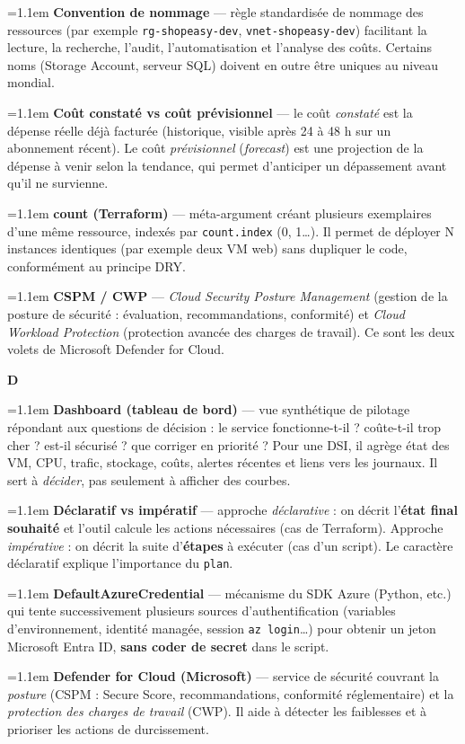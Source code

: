 \documentclass[11pt,a4paper]{article}
\newcommand{\co}[1]{\texttt{\small #1}}
\newcommand{\lettre}[1]{%
  \par\addvspace{9pt}\needspace{4.5\baselineskip}%
  \markright{#1}%
  {\noindent\sffamily\bfseries\Large\color{azure}#1}%
  \nobreak\vspace{0.4mm}{\color{azure!45}\hrule height 1pt}\nobreak\vspace{3mm}\par}
\newcommand{\df}[2]{%
  \par\addvspace{4pt}\needspace{2\baselineskip}%
  \hangindent=1.1em\hangafter=1
  {\sffamily\bfseries\color{azuredark}#1} — #2\par}
\begin{document}
\df{Convention de nommage}{règle standardisée de nommage des ressources (par exemple \co{rg-shopeasy-dev}, \co{vnet-shopeasy-dev}) facilitant la lecture, la recherche, l'audit, l'automatisation et l'analyse des coûts. Certains noms (Storage Account, serveur SQL) doivent en outre être uniques au niveau mondial.}

\df{Coût constaté vs coût prévisionnel}{le coût \emph{constaté} est la dépense réelle déjà facturée (historique, visible après 24 à 48 h sur un abonnement récent). Le coût \emph{prévisionnel} (\emph{forecast}) est une projection de la dépense à venir selon la tendance, qui permet d'anticiper un dépassement avant qu'il ne survienne.}

\df{count (Terraform)}{méta-argument créant plusieurs exemplaires d'une même ressource, indexés par \co{count.index} (0, 1\dots). Il permet de déployer N instances identiques (par exemple deux VM web) sans dupliquer le code, conformément au principe DRY.}

\df{CSPM / CWP}{\emph{Cloud Security Posture Management} (gestion de la posture de sécurité : évaluation, recommandations, conformité) et \emph{Cloud Workload Protection} (protection avancée des charges de travail). Ce sont les deux volets de Microsoft Defender for Cloud.}

\lettre{D}

\df{Dashboard (tableau de bord)}{vue synthétique de pilotage répondant aux questions de décision : le service fonctionne-t-il ? coûte-t-il trop cher ? est-il sécurisé ? que corriger en priorité ? Pour une DSI, il agrège état des VM, CPU, trafic, stockage, coûts, alertes récentes et liens vers les journaux. Il sert à \emph{décider}, pas seulement à afficher des courbes.}

\df{Déclaratif vs impératif}{approche \emph{déclarative} : on décrit l'\textbf{état final souhaité} et l'outil calcule les actions nécessaires (cas de Terraform). Approche \emph{impérative} : on décrit la suite d'\textbf{étapes} à exécuter (cas d'un script). Le caractère déclaratif explique l'importance du \co{plan}.}

\df{DefaultAzureCredential}{mécanisme du SDK Azure (Python, etc.) qui tente successivement plusieurs sources d'authentification (variables d'environnement, identité managée, session \co{az login}\dots) pour obtenir un jeton Microsoft Entra ID, \textbf{sans coder de secret} dans le script.}

\df{Defender for Cloud (Microsoft)}{service de sécurité couvrant la \emph{posture} (CSPM : Secure Score, recommandations, conformité réglementaire) et la \emph{protection des charges de travail} (CWP). Il aide à détecter les faiblesses et à prioriser les actions de durcissement.}
\end{document}
